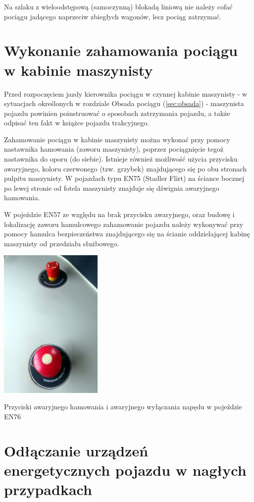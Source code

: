 Na szlaku z wieloodstępową (samoczynną) blokadą liniową nie należy cofać pociągu jadącego naprzeciw zbiegłych wagonów, lecz pociąg zatrzymać.

\chapter{Wykonanie zahamowania pociągu w kabinie maszynisty}

Przed rozpoczęciem jazdy kierownika pociągu w czynnej kabinie maszynisty - w sytuacjach określonych w rozdziale Obsada pociągu (\ref{sec:obsada}) - maszynista pojazdu powinien poinstruować o sposobach zatrzymania pojazdu, a także odpisać ten fakt w książce pojazdu trakcyjnego.

Zahamowanie pociągu w kabinie maszynisty można wykonać przy pomocy nastawnika hamowania (zaworu maszynisty), poprzez pociągnięcie tegoż nastawnika do oporu (do siebie). Istnieje również możliwość użycia przycisku awaryjnego, koloru czerwonego (tzw. grzybek) znajdującego się po obu stronach pulpitu maszynisty. W pojazdach typu EN75 (Stadler Flirt) na ściance bocznej po lewej stronie od fotela maszynisty znajduje się dźwignia awaryjnego hamowania. 

W pojeździe EN57 ze względu na brak przycisku awaryjnego, oraz budowę i lokalizację zaworu hamulcowego zahamowanie pojazdu należy wykonywać przy pomocy hamulca bezpieczeństwa znajdującego się na ścianie oddzielającej kabinę maszynisty od przedziału służbowego.
\begin{marginfigure}
	\includegraphics[width=5cm]{skryptkierownik-img/grzybek.jpg}
	\caption{Przyciski awaryjnego hamowania i awaryjnego wyłączania napędu w pojeździe EN76}
\end{marginfigure}


\chapter{Odłączanie urządzeń energetycznych pojazdu w nagłych przypadkach}

